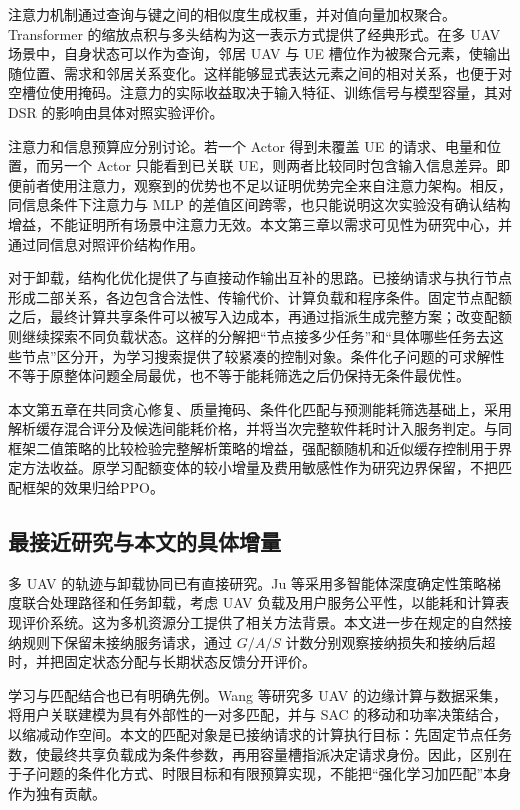 注意力机制通过查询与键之间的相似度生成权重，并对值向量加权聚合。Transformer 的缩放点积与多头结构为这一表示方式提供了经典形式\cite{vaswani2017attention}。在多 UAV 场景中，自身状态可以作为查询，邻居 UAV 与 UE 槽位作为被聚合元素，使输出随位置、需求和邻居关系变化。这样能够显式表达元素之间的相对关系，也便于对空槽位使用掩码。注意力的实际收益取决于输入特征、训练信号与模型容量，其对 DSR 的影响由具体对照实验评价。

注意力和信息预算应分别讨论。若一个 Actor 得到未覆盖 UE 的请求、电量和位置，而另一个 Actor 只能看到已关联 UE，则两者比较同时包含输入信息差异。即便前者使用注意力，观察到的优势也不足以证明优势完全来自注意力架构。相反，同信息条件下注意力与 MLP 的差值区间跨零，也只能说明这次实验没有确认结构增益，不能证明所有场景中注意力无效。本文第三章以需求可见性为研究中心，并通过同信息对照评价结构作用。

对于卸载，结构化优化提供了与直接动作输出互补的思路。已接纳请求与执行节点形成二部关系，各边包含合法性、传输代价、计算负载和程序条件。固定节点配额之后，最终计算共享条件可以被写入边成本，再通过指派生成完整方案；改变配额则继续探索不同负载状态。这样的分解把“节点接多少任务”和“具体哪些任务去这些节点”区分开，为学习搜索提供了较紧凑的控制对象。条件化子问题的可求解性不等于原整体问题全局最优，也不等于能耗筛选之后仍保持无条件最优性。

本文第五章在共同贪心修复、质量掩码、条件化匹配与预测能耗筛选基础上，采用解析缓存混合评分及候选间能耗价格，并将当次完整软件耗时计入服务判定。与同框架二值策略的比较检验完整解析策略的增益，强配额随机和近似缓存控制用于界定方法收益。原学习配额变体的较小增量及费用敏感性作为研究边界保留，不把匹配框架的效果归给PPO。

\subsection{最接近研究与本文的具体增量}
\label{sec:ch1-closest-work}

多 UAV 的轨迹与卸载协同已有直接研究。Ju 等采用多智能体深度确定性策略梯度联合处理路径和任务卸载，考虑 UAV 负载及用户服务公平性，以能耗和计算表现评价系统\cite{ju2024multi}。这为多机资源分工提供了相关方法背景。本文进一步在规定的自然接纳规则下保留未接纳服务请求，通过 $G/A/S$ 计数分别观察接纳损失和接纳后超时，并把固定状态分配与长期状态反馈分开评价。

学习与匹配结合也已有明确先例。Wang 等研究多 UAV 的边缘计算与数据采集，将用户关联建模为具有外部性的一对多匹配，并与 SAC 的移动和功率决策结合，以缩减动作空间\cite{wang2025matching}。本文的匹配对象是已接纳请求的计算执行目标：先固定节点任务数，使最终共享负载成为条件参数，再用容量槽指派决定请求身份。因此，区别在于子问题的条件化方式、时限目标和有限预算实现，不能把“强化学习加匹配”本身作为独有贡献。

